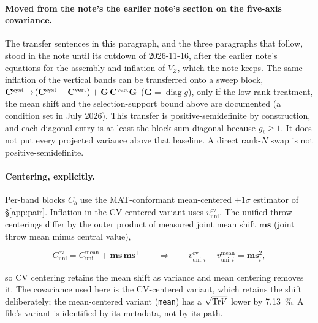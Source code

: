 \paragraph{Moved from the note's the earlier note's section on the five-axis covariance.} The transfer sentences in this paragraph, and the three paragraphs that follow, stood in the note until its cutdown of 2026-11-16, after the earlier note's equations for the assembly and inflation of $V_Z$, which the note keeps. The same inflation of the vertical bands can be transferred onto a sweep block, $\mathbf{C}^{\text{syst}}\!\to\!(\mathbf{C}^{\text{syst}}-\mathbf{C}^{\mathrm{vert}})+\mathbf{G}\,\mathbf{C}^{\mathrm{vert}}\mathbf{G}$ ($\mathbf{G}=\operatorname{diag}g$), only if the low-rank treatment, the mean shift and the selection-support bound above are documented (a condition set in July 2026). This transfer is positive-semidefinite by construction, and each diagonal entry is at least the block-sum diagonal because $g_{i}\ge 1$. It does not put every projected variance above that baseline. A direct rank-$N$ swap is not positive-semidefinite.

\paragraph{Centering, explicitly.} Per-band blocks $C_{b}$ use the MAT-conformant mean-centered $\pm1\sigma$ estimator of \S\ref{app:pair}. Inflation in the CV-centered variant uses $v^{\mathrm{cv}}_{\mathrm{uni}}$. The unified-throw centerings differ by the outer product of measured joint mean shift $\mathbf{ms}$ (joint throw mean minus central value),

\begin{equation}
  \label{eq:zcentering}
  C^{\mathrm{cv}}_{\mathrm{uni}}
  = C^{\mathrm{mean}}_{\mathrm{uni}} + \mathbf{ms}\,\mathbf{ms}^{\top}
  \qquad\Longrightarrow\qquad
  v^{\mathrm{cv}}_{\mathrm{uni},i}-v^{\mathrm{mean}}_{\mathrm{uni},i}
  = \mathbf{ms}_{i}^{2},
\end{equation}

so CV centering retains the mean shift as variance and mean centering removes it. The covariance used here is the CV-centered variant, which retains the shift deliberately; the mean-centered variant (\texttt{mean}) has a $\sqrt{\mathrm{Tr} V}$ lower by \SI{7.13}{\percent}. A file's variant is identified by its metadata, not by its path.

